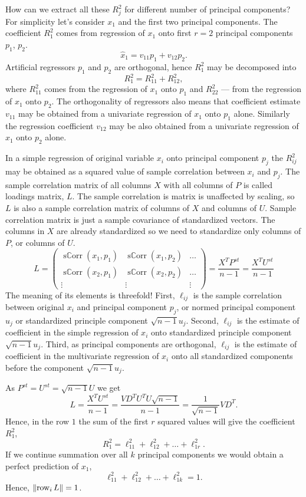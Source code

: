 \documentclass[12pt]{article}
\DeclareMathOperator{\sCorr}{s\mathbb{C}orr}
\DeclareMathOperator{\row}{row}
\DeclarePairedDelimiter{\norm}{\lVert}{\rVert}
\begin{document}
How can we extract all these $R^2_j$ for different number of principal components?
For simplicity let's consider $x_1$ and the first two principal components.
The coefficient $R^2_1$ comes from regression of $x_1$ onto first $r = 2$ principal components $p_1$, $p_2$.
\[
\hat x_1 = v_{11} p_1 + v_{12} p_2.
\]
Artificial regressors $p_1$ and $p_2$ are orthogonal, hence $R^2_1$ may be decomposed into 
\[
R^2_1 = R^2_{11} + R^2_{12},
\]
where $R^2_{11}$ comes from the regression of $x_1$ onto $p_1$ and $R^2_{22}$ — from the regression of $x_1$ onto $p_2$.
The orthogonality of regressors also means that coefficient estimate $v_{11}$ may be obtained from a univariate regression of $x_1$ onto $p_1$ alone. 
Similarly the regression coefficient $v_{12}$ may be also obtained from a univariate regression of $x_1$ onto $p_2$ alone. 

In a simple regression of original variable $x_i$ onto principal component $p_j$ the $R^2_{ij}$ may be obtained as a squared value of sample correlation between $x_i$ and $p_j$.
The sample correlation matrix of all columns $X$ with all columns of $P$ is called loadings matrix, $L$.
The sample correlation is matrix is unaffected by scaling, so $L$ is also a sample correlation matrix of columns of $X$ and columns of $U$.
Sample correlation matrix is just a sample covariance of standardized vectors.
The columns in $X$ are already standardized so we need to standardize only columns of $P$, or columns of $U$.
\[
L = \begin{pmatrix}
    \sCorr(x_1, p_1) & \sCorr(x_1, p_2) & \ldots \\
    \sCorr(x_2, p_1) & \sCorr(x_2, p_2) & \ldots \\
    \vdots & \vdots & \vdots 
\end{pmatrix} = 
\frac{X^T P^{st}}{n - 1} = \frac{X^T U^{st}}{n - 1}
\]
The meaning of its elements is threefold! 
First, $\ell_{ij}$ is the sample correlation between original $x_i$ and principal component $p_j$,
or normed principal component $u_j$ or standardized principle component $\sqrt{n-1} u_j$.
Second, $\ell_{ij}$ is the estimate of coefficient in the simple regression of $x_i$ onto standardized principle component $\sqrt{n-1} u_j$.
Third, as principal components are orthogonal, 
$\ell_{ij}$ is the estimate of coefficient in the multivariate regression of $x_i$ onto all standardized components before the component $\sqrt{n-1} u_j$.

As $P^{st} = U^{st} = \sqrt{n-1} U$ we get
\[
L =  \frac{X^T U^{st}}{n - 1} = \frac{VD^T U^T U\sqrt{n-1}}{n-1} = \frac{1}{\sqrt{n-1}}V D^T.
\]
Hence, in the row $1$ the sum of the first $r$ squared values will give the coefficient $R^2_1$,
\[
R^2_1 = \ell_{11}^2 + \ell_{12}^2 + \dots + \ell_{1r}^2.
\]
If we continue summation over all $k$ principal components we would obtain a perfect prediction of $x_1$,
\[
    \ell_{11}^2 + \ell_{12}^2 + \dots + \ell_{1k}^2 = 1.
\]
Hence, $\norm{\row_i L} = 1$.
\end{document}
